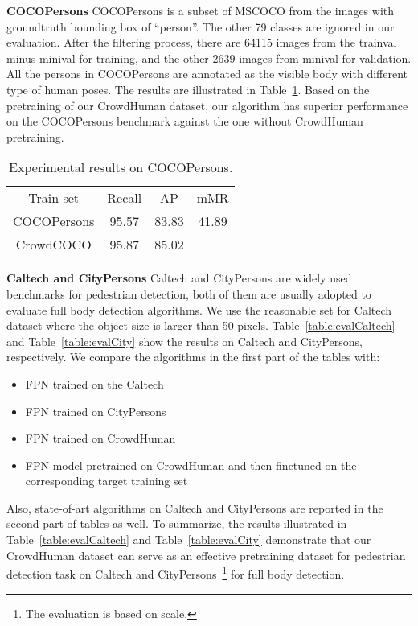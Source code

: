 \documentclass[10pt,twocolumn,letterpaper]{article}
\newcommand{\myparagraph}[1]{{\vspace{0.5em} \noindent \bf #1}}
\begin{document}
\myparagraph{COCOPersons} COCOPersons is a subset of MSCOCO from the images with groundtruth bounding box of ``person''. The other 79 classes are ignored in our evaluation. After the filtering process, there are 64115 images from the trainval minus minival for training, and the other 2639 images from minival for validation. All the persons in COCOPersons are annotated as the visible body with different type of human poses. The results are illustrated in Table~\ref{table:cocoperson}. Based on the pretraining of our CrowdHuman dataset, our algorithm has superior performance on the COCOPersons benchmark against the one without CrowdHuman pretraining. 

\setlength{\tabcolsep}{4pt}
\begin{table}
\begin{center}
\caption{Experimental results on COCOPersons.}
\label{table:cocoperson}
\begin{tabular}{cccc}
\hline\noalign{\smallskip}
{Train-set} & Recall & AP & mMR\\
\noalign{\smallskip}
\hline
\noalign{\smallskip}
COCOPersons & {95.57}  & {83.83} & {41.89}\\
CrowdCOCO & {95.87}  & {85.02} & {}\\
\hline
\end{tabular}
\end{center}
\end{table}
\setlength{\tabcolsep}{1.4pt}


\myparagraph{Caltech and CityPersons} Caltech and CityPersons are widely used benchmarks for pedestrian detection, both of them are usually adopted to evaluate full body detection algorithms. We use the reasonable set for Caltech dataset where the object size is larger than 50 pixels.  
Table~\ref{table:evalCaltech} and Table~\ref{table:evalCity} show the results on Caltech and CityPersons, respectively. We compare the algorithms in the first part of the tables with:
\begin{itemize}
    \item FPN trained on the Caltech
    \item FPN trained on CityPersons
    \item FPN trained on CrowdHuman
    \item FPN model pretrained on CrowdHuman and then finetuned on the corresponding target training set
\end{itemize}
Also, state-of-art algorithms on Caltech and CityPersons are reported in the second part of tables as well.
To summarize, the results illustrated in Table~\ref{table:evalCaltech} and Table~\ref{table:evalCity}  demonstrate that our CrowdHuman dataset can serve as an effective pretraining dataset for pedestrian detection task on Caltech and CityPersons~\footnote{The evaluation is based on  scale.} for full body detection.
\end{document}
